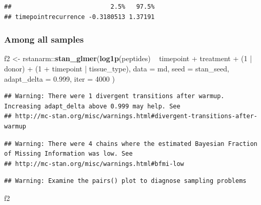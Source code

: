 \documentclass[]{article}
\newenvironment{Shaded}{\begin{snugshade}}{\end{snugshade}}
\newcommand{\KeywordTok}[1]{\textcolor[rgb]{0.13,0.29,0.53}{\textbf{{#1}}}}
\newcommand{\DataTypeTok}[1]{\textcolor[rgb]{0.13,0.29,0.53}{{#1}}}
\newcommand{\DecValTok}[1]{\textcolor[rgb]{0.00,0.00,0.81}{{#1}}}
\newcommand{\FloatTok}[1]{\textcolor[rgb]{0.00,0.00,0.81}{{#1}}}
\newcommand{\StringTok}[1]{\textcolor[rgb]{0.31,0.60,0.02}{{#1}}}
\newcommand{\NormalTok}[1]{{#1}}
\begin{document}
\begin{verbatim}
##                           2.5%   97.5%
## timepointrecurrence -0.3180513 1.37191
\end{verbatim}

\subsubsection{Among all samples}\label{among-all-samples}

\begin{Shaded}
\begin{Highlighting}[]
\NormalTok{f2 <-}\StringTok{ }\NormalTok{rstanarm::}\KeywordTok{stan_glmer}\NormalTok{(}\KeywordTok{log1p}\NormalTok{(peptides) ~}\StringTok{ }
\StringTok{                                }\NormalTok{timepoint +}\StringTok{ }\NormalTok{treatment +}\StringTok{ }\NormalTok{(}\DecValTok{1} \NormalTok{|}\StringTok{ }\NormalTok{donor) +}
\StringTok{                                }\NormalTok{(}\DecValTok{1} \NormalTok{+}\StringTok{ }\NormalTok{timepoint |}\StringTok{ }\NormalTok{tissue_type),}
                              \DataTypeTok{data =} \NormalTok{md,}
                              \DataTypeTok{seed =} \NormalTok{stan_seed,}
                              \DataTypeTok{adapt_delta =} \FloatTok{0.999}\NormalTok{,}
                              \DataTypeTok{iter =} \DecValTok{4000}
                              \NormalTok{)}
\end{Highlighting}
\end{Shaded}

\begin{verbatim}
## Warning: There were 1 divergent transitions after warmup. Increasing adapt_delta above 0.999 may help. See
## http://mc-stan.org/misc/warnings.html#divergent-transitions-after-warmup
\end{verbatim}

\begin{verbatim}
## Warning: There were 4 chains where the estimated Bayesian Fraction of Missing Information was low. See
## http://mc-stan.org/misc/warnings.html#bfmi-low
\end{verbatim}

\begin{verbatim}
## Warning: Examine the pairs() plot to diagnose sampling problems
\end{verbatim}

\begin{Shaded}
\begin{Highlighting}[]
\NormalTok{f2}
\end{Highlighting}
\end{Shaded}
\end{document}

